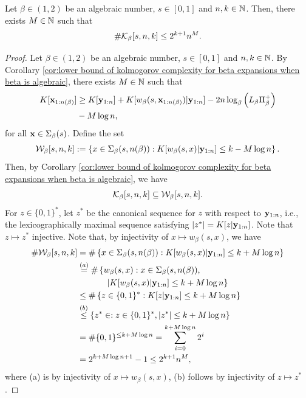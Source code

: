\begin{corollary}
    Let $\beta \in (1,2)$ be an algebraic number, $s \in [0,1]$ and $n,k \in \mathbb{N}$. Then, there exists $M \in \mathbb{N}$ such that
    \begin{equation}
        \# \mathcal{K}_\beta[s,n,k] \leq 2^{k+1} n^M.
    \end{equation}
\end{corollary}
\begin{proof}
    Let $\beta \in (1,2)$ be an algebraic number, $s \in [0,1]$ and $n,k \in \mathbb{N}$. By Corollary \ref{cor:lower bound of kolmogorov complexity for beta expansions when beta is algebraic}, there exists $M \in \mathbb{N}$ such that 
    \begin{align}
        K[{\bf x}_{1:n(\beta)}] &\geq K[{\bf y}_{1:n}] + K[w_\beta(s,{\bf x}_{1:n(\beta)})|{\bf y}_{1:n}] - 2n \log_\beta\left(L_\beta \Pi_\beta^+\right)\\ 
        &- M\log n,
    \end{align}
    for all ${\bf x} \in \Sigma_\beta(s)$. Define the set 
    \begin{equation}
        \mathcal{W}_\beta[s,n,k] := \left\{ x \in \Sigma_\beta(s,n(\beta)) : K[w_\beta(s,x)|{\bf y}_{1:n}] \leq  k - M\log n\right\}.
    \end{equation}
    Then, by Corollary \ref{cor:lower bound of kolmogorov complexity for beta expansions when beta is algebraic}, we have 
    \begin{equation}
        \mathcal{K}_\beta[s,n,k] \subseteq \mathcal{W}_\beta[s,n,k].
    \end{equation}
    For $z \in \{0,1\}^\ast$, let $z^\ast$ be the canonical sequence for $z$ with respect to ${\bf y}_{1:n}$, i.e., the lexicographically maximal sequence satisfying $|z^\ast| = K[z|{\bf y}_{1:n}]$. Note that $z \mapsto z^\ast$ injective. Note that, by injectivity of $x\mapsto w_\beta(s,x)$, we have
    \begin{align}
        \#\mathcal{W}_\beta[s,n,k] &= \#\left\{ x \in \Sigma_\beta(s,n(\beta)) : K[w_\beta(s,x)|{\bf y}_{1:n}] \leq  k + M\log n\right\}\\
        &\overset{(a)}{=} \#\left\{ w_\beta(s,x) : x \in \Sigma_\beta(s,n(\beta)),\right.\\
        & \hspace{0.45in} \left. |K[w_\beta(s,x)|{\bf y}_{1:n}] \leq  k + M\log n\right\}\\
        &\leq \#\left\{ z \in \{0,1\}^\ast : K[z|{\bf y}_{1:n}] \leq k + M \log n\right\}\\
        &\overset{(b)}{\leq} \{ z^\ast \in  : z \in \{0,1\}^\ast,  |z^\ast| \leq k + M \log n\}\\
        &= \# \{0,1\}^{\leq k + M \log n} = \sum_{i=0}^{k + M\log n} 2^i\\
        & = 2^{k + M \log n+1} - 1 \leq 2^{k+1} n^M,
    \end{align}
    where (a) is by injectivity of $x \mapsto w_\beta(s,x)$, (b) follows by injectivity of $z \mapsto z^\ast$.
\end{proof}